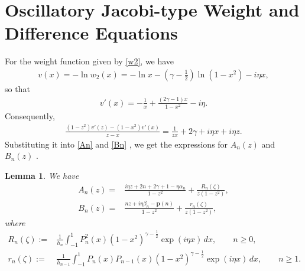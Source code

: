 \documentclass[11pt,a4paper]{article}
\newtheorem{lemma}[theorem]{Lemma}
\numberwithin{equation}{section}
\begin{document}
\section{Oscillatory Jacobi-type Weight  and Difference Equations}
For the weight function given by \eqref{w2}, we have
\begin{align}
v(x)=-\ln w_2(x)=-\ln x-\left(\gamma-\frac{1}{2}\right)\ln (1-x^{2})-\mathit{i}\eta x,
\end{align}
so that
\begin{align}
v'(x)=-\frac{1}{x}+\frac{(2\gamma-1)x}{1-x^{2}}-\mathit{i}\eta.
\end{align}
Consequently,
\begin{align*}
\frac{(1-z^{2})v'(z)-(1-x^{2})v'(x)}{z-x}=\frac{1}{zx}+2\gamma+ \mathit{i}\eta x+\mathit{i}\eta z.
\end{align*}
Substituting it into \eqref{An} and \eqref{Bn} , we get the expressions for $ A_{n}(z) $ and $ B_{n}(z) $ .
\begin{lemma}
We have
	\begin{align}
A_{n}(z)=&\frac{\mathit{i}\eta z+2n+2\gamma+1-\eta\alpha_n}{1-z^{2}} +\frac{R_{n}(\zeta)}{z(1-z^{2})},\label{(2.8)}\\
B_{n}(z)=&\frac{nz+\mathit{i}\eta\beta_n-\textbf{p}(n)}{1-z^{2}} +\frac{r_{n}(\zeta)}{z(1-z^{2})}, \label{(2.9)}
\end{align}
where
\begin{align}
R_{n}(\zeta):=&\frac{1}{h_{n}}\int_{-1}^{1}P_{n}^2(x)(1-x^{2})^{\gamma-\frac{1}{2}}\exp(\mathit{i}\eta x)\,dx ,\qquad n\geq0,\\
r_{n}(\zeta):=&\frac{1}{h_{n-1}}\int_{-1}^{1}P_{n}(x)P_{n-1}(x)(1-x^{2})^{\gamma-\frac{1}{2}}\exp(\mathit{i}\eta x)\,dx,\qquad n\geq1.
\end{align}
\end{lemma}
\end{document}
